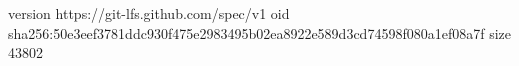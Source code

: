 version https://git-lfs.github.com/spec/v1
oid sha256:50e3eef3781ddc930f475e2983495b02ea8922e589d3cd74598f080a1ef08a7f
size 43802
